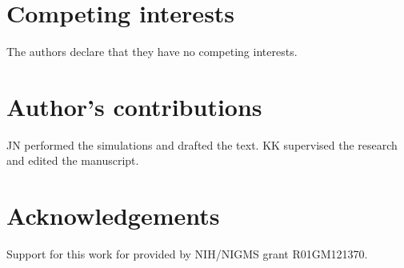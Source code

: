 \documentclass[twocolumn]{bmcart}%
\begin{document}

\begin{backmatter}

\section*{Competing interests}
  The authors declare that they have no competing interests.

\section*{Author's contributions}
JN performed the simulations and drafted the text.  KK supervised the research and edited the manuscript.

\section*{Acknowledgements}
Support for this work for provided by NIH/NIGMS grant R01GM121370.
  
  




\end{backmatter}
\end{document}
